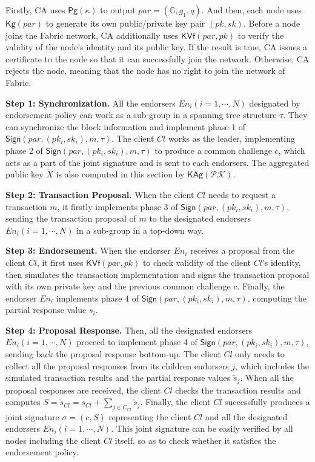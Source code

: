 \documentclass[journal]{IEEEtran}
\begin{document}
Firstly, CA uses \(\textsf{Pg}(\kappa)\) to output \(par=(\mathbb{G},g_1,q)\). And then, each node uses \(\textsf{Kg}(par)\) to generate its own public/private key pair \((pk,sk)\). Before a node joins the Fabric network, CA additionally uses \(\textsf{KVf}(par,pk)\) to verify the validity of the node's identity and its public key. If the result is true, CA issues a certificate to the node so that it can successfully join the network. Otherwise, CA rejects the node, meaning that the node has no right to join the network of Fabric.

\noindent\textbf{Step 1: Synchronization.} All the endorsers \(En_i(i=1,\cdots,N)\) designated by endorsement policy can work as a sub-group in a spanning tree structure \(\tau\). They can synchronize the block information and implement phase 1 of \(\textsf{Sign}(par,(pk_i,sk_i),m,\tau)\). The client \(Cl\) works as the leader, implementing phase 2 of \(\textsf{Sign}(par,(pk_i,sk_i),m,\tau)\) to produce a common challenge \(c\), which acts as a part of the joint signature and is sent to each endorsers. The aggregated public key \(\tilde{X}\) is also computed in this section by \(\textsf{KAg}(\mathcal{PK})\).

\noindent\textbf{Step 2: Transaction Proposal.} When the client \(Cl\) needs to request a transaction \(m\), it firstly implements phase 3 of \(\textsf{Sign}(par,(pk_i,sk_i),m,\tau)\), sending the transaction proposal of \(m\) to the designated endorsers
\(En_i(i=1,\cdots,N)\) in a sub-group in a top-down way.

\noindent\textbf{Step 3: Endorsement.} When the endorser \(En_i\) receives a proposal from the client \(Cl\), it first uses \(\textsf{KVf}(par,pk)\) to check validity of the client \(Cl\)'s identity, then simulates the transaction implementation and signs the transaction proposal with its own private key and the previous common challenge \(c\). Finally, the endorser \(En_i\) implements phase 4 of \(\textsf{Sign}(par,(pk_i,sk_i),m,\tau)\), computing the partial response value \({s}_i\).

\noindent\textbf{Step 4: Proposal Response.} Then, all the designated endorsers \(En_i(i=1,\cdots,N)\) proceed to implement phase 4 of \(\textsf{Sign}(par,(pk_i,sk_i),m,\tau)\), sending back the proposal response bottom-up. The client \(Cl\) only needs to collect all the proposal responses from its children endorsers \(j\), which includes the simulated transaction results and the partial response values \(\tilde{s}_j\). When all the proposal responses are received, the client \(Cl\) checks the transaction results and computes \(S=\tilde{s}_{Cl}=s_{Cl}+\sum_{j\in C_{Cl}}\tilde{s}_j\). Finally, the client \(Cl\) successfully produces a joint signature \(\sigma=(c,S)\) representing the client \(Cl\) and all the designated endorsers \(En_i(i=1,\cdots,N)\). This joint signature can be easily verified by all nodes including the client \(Cl\) itself, so as to check whether it satisfies the endorsement policy.
\end{document}
